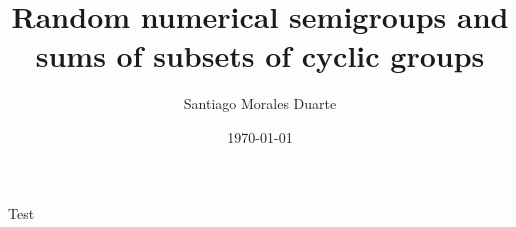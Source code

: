 \documentclass[a4paper, 12pt, twoside]{report}
\title{Random numerical semigroups and sums of subsets of cyclic groups}
\author{Santiago Morales Duarte}
\date{\today}
\theoremstyle{definition}
\theoremstyle{remark}
\begin{document}


% 








\tableofcontents
\listoffigures




Test \cite{thesis_template}













\nocite{*}

\printbibliography
\appendix





\end{document}
